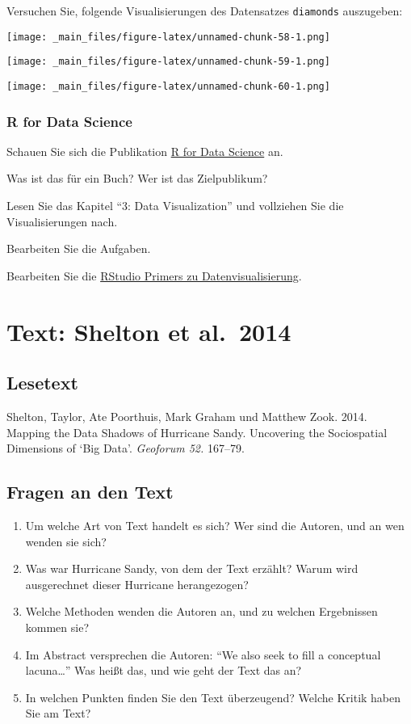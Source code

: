 \documentclass[11pt,german,a4paper]{article}
\providecommand{\tightlist}{%
  \setlength{\itemsep}{0pt}\setlength{\parskip}{0pt}}
\begin{document}
Versuchen Sie, folgende Visualisierungen des Datensatzes \texttt{diamonds} auszugeben:

\texttt{[image: \_main\_files/figure-latex/unnamed-chunk-58-1.png]}

\texttt{[image: \_main\_files/figure-latex/unnamed-chunk-59-1.png]}

\texttt{[image: \_main\_files/figure-latex/unnamed-chunk-60-1.png]}

\hypertarget{r-for-data-science}{%
\subsubsection{R for Data Science}\label{r-for-data-science}}

Schauen Sie sich die Publikation \href{https://r4ds.had.co.nz/}{R for Data Science} an.

Was ist das für ein Buch? Wer ist das Zielpublikum?

Lesen Sie das Kapitel ``3: Data Visualization'' und vollziehen Sie die Visualisierungen nach.

Bearbeiten Sie die Aufgaben.

Bearbeiten Sie die \href{https://rstudio.cloud/learn/primers/3}{RStudio Primers zu Datenvisualisierung}.

\hypertarget{text-shelton-et-al.-2014}{%
\section{Text: Shelton et al.~2014}\label{text-shelton-et-al.-2014}}

\hypertarget{lesetext-1}{%
\subsection{Lesetext}\label{lesetext-1}}

Shelton, Taylor, Ate Poorthuis, Mark Graham und Matthew Zook. 2014. Mapping the Data Shadows of Hurricane Sandy. Uncovering the Sociospatial Dimensions of `Big Data'. \emph{Geoforum 52.} 167--79.

\hypertarget{fragen-an-den-text-1}{%
\subsection{Fragen an den Text}\label{fragen-an-den-text-1}}

\begin{enumerate}
\def\labelenumi{\arabic{enumi}.}
\tightlist
\item
  Um welche Art von Text handelt es sich? Wer sind die Autoren, und an wen wenden sie sich?
\item
  Was war Hurricane Sandy, von dem der Text erzählt? Warum wird ausgerechnet dieser Hurricane herangezogen?
\item
  Welche Methoden wenden die Autoren an, und zu welchen Ergebnissen kommen sie?
\item
  Im Abstract versprechen die Autoren: ``We also seek to fill a conceptual lacuna\ldots{}'' Was heißt das, und wie geht der Text das an?
\item
  In welchen Punkten finden Sie den Text überzeugend? Welche Kritik haben Sie am Text?
\end{enumerate}
\end{document}
